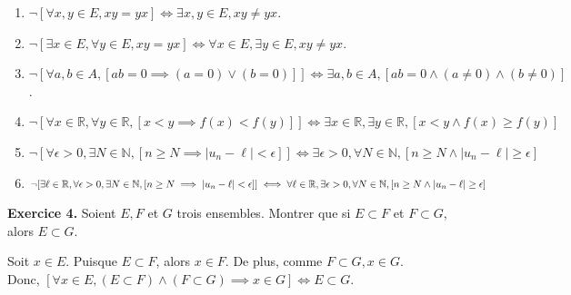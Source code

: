 \documentclass[a4paper, 10pt]{report}
\providecommand{\abs}[1]{\lvert#1\rvert}
\begin{document}
	\colorbox{solution}
	{
		\begin{minipage}{0.9\textwidth}
			\begin{enumerate}[label=(\roman*)]
				\item $\neg[
				\forall x,y \in E,
				xy = yx
				]
				\iff
				\exists x,y \in E,
				xy \neq yx$.
				\item $\neg[
				\exists x \in E,
				\forall y \in E,
				xy = yx
				]
				\iff
				\forall x \in E,
				\exists y \in E,
				xy \neq yx
				$.
				\item $\neg[
				\forall a,b \in A,
				[ab = 0 \implies (a = 0) \lor (b = 0)]
				]
				\iff
				\exists a,b \in A,
				[ab = 0 \land (a \neq 0) \land (b \neq 0)]
				$.
				\item $\neg[
				\forall x \in \mathbb{R},
				\forall y \in \mathbb{R},
				[x < y \implies f(x) < f(y)]
				]
				\iff
				\exists x \in \mathbb{R},
				\exists y \in \mathbb{R},
				[x < y \land f(x) \geq f(y)]
				$
				\item $\neg[
				\forall \epsilon > 0,
				\exists N \in \mathbb{N},
				[n \geq N \implies \abs{u_n - \ell} < \epsilon]
				]
				\iff
				\exists \epsilon > 0,
				\forall N \in \mathbb{N},
				[n \geq N \land \abs{u_n - \ell} \geq \epsilon]
				$
				\item $\neg[
				\exists \ell \in \mathbb{R},
				\forall \epsilon > 0,
				\exists N \in \mathbb{N},
				[n \geq N \implies \abs{u_n - \ell} < \epsilon]
				]\\
				\iff
				\forall \ell \in \mathbb{R},
				\exists \epsilon > 0,
				\forall N \in \mathbb{N},
				[n \geq N \land \abs{u_n - \ell} \geq \epsilon]
				$
			\end{enumerate}
		\end{minipage}
	}
		
	\vspace{5mm}
	\noindent
	\textbf{Exercice 4.} Soient $E, F$ et $G$ trois ensembles. Montrer
	que	si $E \subset F$ et $F \subset G$, alors $E \subset G$.
	
	\colorbox{solution}
	{
		\begin{minipage}{0.9\textwidth}
			Soit $x \in E$. Puisque $E \subset F$, alors $x \in F$.
			De plus, comme $F \subset G, x \in G$.\\
			Donc, $[\forall x \in E, 
			(E \subset F) \land (F \subset G)
			\implies
			x \in G]
			\iff
			E \subset G$.
		\end{minipage}
	}
		
	\newpage
	
\end{document}
